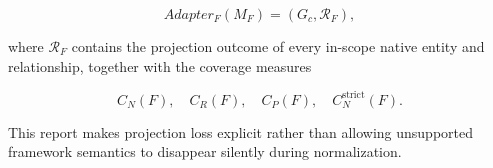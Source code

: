 \documentclass[10pt]{article}
\begin{document}
\begin{equation}
Adapter_F(M_F)
=
(G_c,\mathcal{R}_F),
\end{equation}

where $\mathcal{R}_F$ contains the projection outcome of every in-scope native
entity and relationship, together with the coverage measures

\begin{equation}
C_N(F),\quad
C_R(F),\quad
C_P(F),\quad
C_N^{\mathrm{strict}}(F).
\end{equation}

This report makes projection loss explicit rather than allowing unsupported
framework semantics to disappear silently during normalization.



\end{document}
